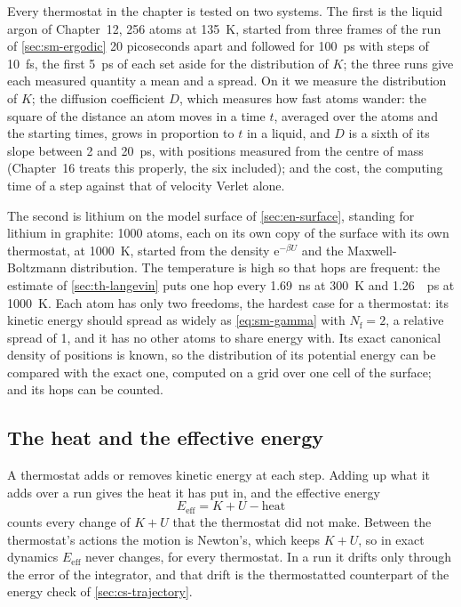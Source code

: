 Every thermostat in the chapter is tested on two systems. The first is
the liquid argon of Chapter~12, 256 atoms at \SI{135}{\kelvin}, started
from three frames of the run of \cref{sec:sm-ergodic} 20 picoseconds
apart and followed for \SI{100}{\pico\second} with steps of
\SI{10}{\femto\second}, the first \SI{5}{\pico\second} of each set aside
for the distribution of $K$; the three runs give each measured quantity a
mean and a spread. On it we measure the distribution of $K$; the
diffusion coefficient $D$, which measures how fast atoms wander: the
square of the distance an atom moves in a time $t$, averaged over the
atoms and the starting times, grows in proportion to $t$ in a liquid, and
$D$ is a sixth of its slope between 2 and \SI{20}{\pico\second}, with
positions measured from the centre of mass (Chapter~16 treats this
properly, the six included); and the cost, the computing time of a step
against that of velocity Verlet alone.

The second is lithium on the model surface of \cref{sec:en-surface},
standing for lithium in graphite: 1000 atoms, each on its own copy of the
surface with its own thermostat, at \SI{1000}{\kelvin}, started from the
density $\mathrm{e}^{-\beta U}$ and the Maxwell-Boltzmann distribution.
The temperature is high so that hops are frequent: the estimate of
\cref{sec:th-langevin} puts one hop every \SI{1.69}{\nano\second} at
\SI{300}{\kelvin} and \SI{1.26}{\per\pico\second} at \SI{1000}{\kelvin}.
Each atom has only two freedoms, the hardest case for a thermostat: its
kinetic energy should spread as widely as \cref{eq:sm-gamma} with
$N_{\mathrm f} = 2$, a relative spread of 1, and it has no other atoms to
share energy with. Its
exact canonical density of positions is known, so the distribution of
its potential energy can be compared with the exact one, computed on a
grid over one cell of the surface; and its hops can be counted.

\subsection*{The heat and the effective energy}

A thermostat adds or removes kinetic energy at each step. Adding up what
it adds over a run gives the heat it has put in, and the effective energy
\begin{equation}
   E_{\mathrm{eff}} = K + U - \text{heat}
   \label{eq:th-effective}
\end{equation}
counts every change of $K + U$ that the thermostat did not make. Between
the thermostat's actions the motion is Newton's, which keeps $K + U$, so
in exact dynamics $E_{\mathrm{eff}}$ never changes, for every thermostat.
In a run it drifts only through the error of the integrator, and that
drift is the thermostatted counterpart of the energy check of
\cref{sec:cs-trajectory}.

